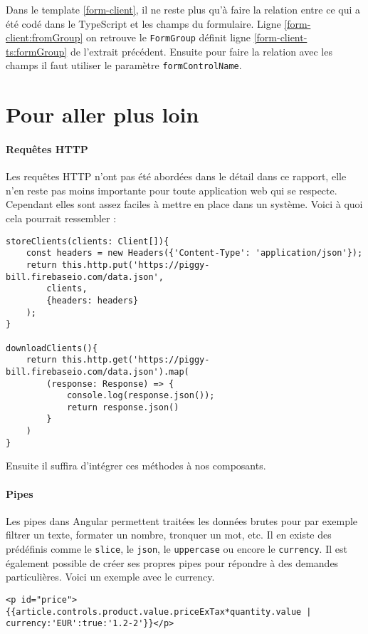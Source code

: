 Dans le template \ref{form-client}, il ne reste plus qu'à faire la relation entre ce qui a été codé dans le TypeScript et les champs du formulaire. Ligne \ref{form-client:fromGroup} on retrouve le \texttt{FormGroup} définit ligne \ref{form-client-ts:formGroup} de l'extrait précédent. Ensuite pour faire la relation avec les champs il faut utiliser le paramètre \texttt{formControlName}.

\section{Pour aller plus loin}
\paragraph{Requêtes HTTP}
Les requêtes HTTP n'ont pas été abordées dans le détail dans ce rapport, elle n'en reste pas moins importante pour toute application web qui se respecte. Cependant elles sont assez faciles à mettre en place dans un système. Voici à quoi cela pourrait ressembler :
\begin{lstlisting}[style=htmlcssjs, caption={Requetes HTTP}, label=http]
storeClients(clients: Client[]){
	const headers = new Headers({'Content-Type': 'application/json'});
	return this.http.put('https://piggy-bill.firebaseio.com/data.json',
  		clients,
  		{headers: headers}
	);
}

downloadClients(){
	return this.http.get('https://piggy-bill.firebaseio.com/data.json').map(
  		(response: Response) => {
    		console.log(response.json());
    		return response.json()
  		}
	)
}
\end{lstlisting}
 Ensuite il suffira d'intégrer ces méthodes à nos composants.

\paragraph{Pipes}
Les pipes dans Angular permettent traitées les données brutes pour par exemple filtrer un texte, formater un nombre, tronquer un mot, etc. Il en existe des prédéfinis comme le \texttt{slice}, le \texttt{json}, le \texttt{uppercase} ou encore le \texttt{currency}. Il est également possible de créer ses propres pipes pour répondre à des demandes particulières. Voici un exemple avec le currency.
\begin{lstlisting}[style=htmlcssjs, caption={Pipe}, label=pipe]
<p id="price">{{article.controls.product.value.priceExTax*quantity.value | currency:'EUR':true:'1.2-2'}}</p>
\end{lstlisting}

